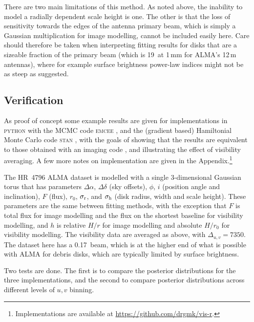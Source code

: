 \documentclass[fleqn,usenatbib]{mnras}
\begin{document}
There are two main limitations of this method. As noted above, the inability to model a radially dependent scale height is one. The other is that the loss of sensitivity towards the edges of the antenna primary beam, which is simply a Gaussian multiplication for image modelling, cannot be included easily here. Care should therefore be taken when interpreting fitting results for disks that are a sizeable fraction of the primary beam (which is 19\arcsec~at 1\,mm for ALMA's 12\,m antennas), where for example surface brightness power-law indices might not be as steep as suggested.

\subsection{Verification}

As proof of concept some example results are given for implementations in \textsc{python} with the MCMC code \textsc{emcee} \citep{2013PASP..125..306F}, and the (gradient based) Hamiltonial Monte Carlo code \textsc{stan} \citep{2017JSS....76....1C}, with the goals of showing that the results are equivalent to those obtained with an imaging code \citep[e.g.][]{2021MNRAS.504.4497C}, and illustrating the effect of visibility averaging. A few more notes on implementation are given in the Appendix.\footnote{Implementations are available at \href{https://github.com/drgmk/vis-r}{https://github.com/drgmk/vis-r}.}

The HR~4796 ALMA dataset is modelled with a single 3-dimensional Gaussian torus that has parameters $\Delta \alpha$, $\Delta \delta$ (sky offsets), $\phi$, $i$ (position angle and inclination), $F$ (flux), $r_0$, $\sigma_{\rm r}$, and $\sigma_{\rm h}$ (disk radius, width and scale height). These parameters are the same between fitting methods, with the exception that $F$ is total flux for image modelling and the flux on the shortest baseline for visibility modelling, and $h$ is relative $H/r$ for image modelling and absolute $H/r_0$ for visibility modelling. The visibility data are averaged as above, with $\Delta_{u,v} = 7350$. The dataset here has a 0.17\arcsec~beam, which is at the higher end of what is possible with ALMA for debris disks, which are typically limited by surface brightness.

Two tests are done. The first is to compare the posterior distributions for the three implementations, and the second to compare posterior distributions across different levels of $u,v$ binning.
\end{document}
